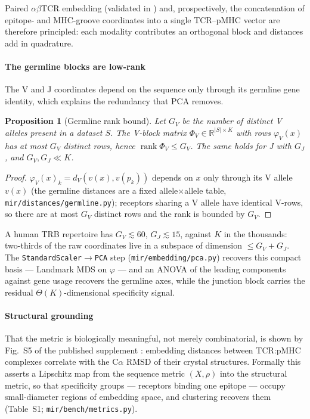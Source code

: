 \documentclass[11pt]{article}
\theoremstyle{oldplain}
\newtheorem{proposition}{Proposition}
\theoremstyle{oldrem}
\newcommand{\R}{\mathds{R}}  %
\newcommand{\code}[1]{\texttt{#1}}
\begin{document}
Paired $\alpha\beta${\scshape TCR} embedding (validated in \cite{Kremlyakova2025}) and, prospectively, the concatenation of
epitope- and {\scshape MHC}-groove coordinates into a single {\scshape TCR}--pMHC vector are therefore
principled: each modality contributes an orthogonal block and distances add in quadrature.

\paragraph{The germline blocks are low-rank} The V and J coordinates depend on the sequence only through
its germline gene identity, which explains the redundancy that {\scshape PCA} removes.

\begin{proposition}[Germline rank bound]\label{prop:rank}
Let $G_V$ be the number of distinct V alleles present in a dataset $S$. The V-block matrix
$\Phi_V\in\R^{\lvert S\rvert\times K}$ with rows $\varphi_V(x)$ has at most $G_V$ distinct rows, hence
$\operatorname{rank}\Phi_V \le G_V$. The same holds for J with $G_J$, and $G_V,G_J \ll K$.
\end{proposition}
\begin{proof}
$\varphi_V(x)_k = d_V(v(x), v(p_k))$ depends on $x$ only through its V allele $v(x)$ (the germline
distances are a fixed allele$\times$allele table, \code{mir/distances/germline.py}); receptors sharing a
V allele have identical V-rows, so there are at most $G_V$ distinct rows and the rank is bounded by
$G_V$.
\end{proof}

A human {\scshape TRB} repertoire has $G_V\lesssim 60$, $G_J\lesssim 15$, against $K$ in the thousands:
two-thirds of the raw coordinates live in a subspace of dimension $\le G_V+G_J$. The
\code{StandardScaler}$\to$\code{PCA} step (\code{mir/embedding/pca.py}) recovers this compact basis ---
Landmark {\scshape MDS} on $\varphi$ --- and an {\scshape ANOVA} of the leading components against gene
usage recovers the germline axes, while the junction block carries the residual $\Theta(K)$-dimensional
specificity signal.

\paragraph{Structural grounding} That the metric is biologically meaningful, not merely combinatorial, is
shown by Fig.~S5 of the published supplement \cite{Kremlyakova2025}: embedding distances between {\scshape TCR}:pMHC complexes correlate with
the C$\alpha$ {\scshape RMSD} of their crystal structures. Formally this asserts a Lipschitz map from the
sequence metric $(X,\rho)$ into the structural metric, so that specificity groups \cite{Glanville2017} ---
receptors binding one epitope --- occupy small-diameter regions of embedding space, and clustering recovers
them (Table~S1;
\code{mir/bench/metrics.py}).
\end{document}
